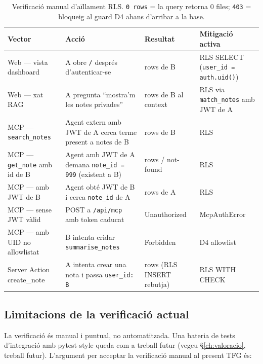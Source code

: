 \begin{table}[H]
    \centering
    \scriptsize
    \caption{Verificació manual d'aïllament RLS. \texttt{0 rows} = la query retorna 0 files; \texttt{403} = bloqueig al guard D4 abans d'arribar a la base.}
    \label{tab:rls-vectors}
    \begin{tabular}{@{}>{\raggedright\arraybackslash}p{3.2cm}>{\raggedright\arraybackslash}p{4cm}>{\raggedright\arraybackslash}p{2.4cm}>{\raggedright\arraybackslash}p{3cm}@{}}
        \toprule
        Vector & Acció & Resultat & Mitigació activa \\
        \midrule
        Web --- vista dashboard & A obre \texttt{/} després d'autenticar-se & 0 rows de B & RLS SELECT (\texttt{user\_id = auth.uid()}) \\
        Web --- xat RAG & A pregunta ``mostra'm les notes privades'' & 0 rows de B al context & RLS via \texttt{match\_notes} amb JWT de A \\
        MCP --- \texttt{search\_notes} & Agent extern amb JWT de A cerca terme present a notes de B & 0 rows de B & RLS \\
        MCP --- \texttt{get\_note} amb id de B & Agent amb JWT de A demana \texttt{note\_id = 999} (existent a B) & 0 rows / not-found & RLS \\
        MCP --- amb JWT de B & Agent obté JWT de B i cerca \texttt{note\_id} de A & 0 rows de A & RLS \\
        MCP --- sense JWT vàlid & POST a \texttt{/api/mcp} amb token caducat & 401 Unauthorized & McpAuthError \\
        MCP --- amb UID no allowlistat & B intenta cridar \texttt{summarise\_notes} & 403 Forbidden & D4 allowlist \\
        Server Action create\_note & A intenta crear una nota i passa \texttt{user\_id: B} & 0 rows (RLS INSERT rebutja) & RLS WITH CHECK \\
        \bottomrule
    \end{tabular}
\end{table}

\subsection{Limitacions de la verificació actual}

La verificació és manual i puntual, no automatitzada. Una bateria de tests d'integració amb pytest-style queda com a treball futur (vegeu \S\ref{ch:valoracio}, treball futur). L'argument per acceptar la verificació manual al present TFG és:

